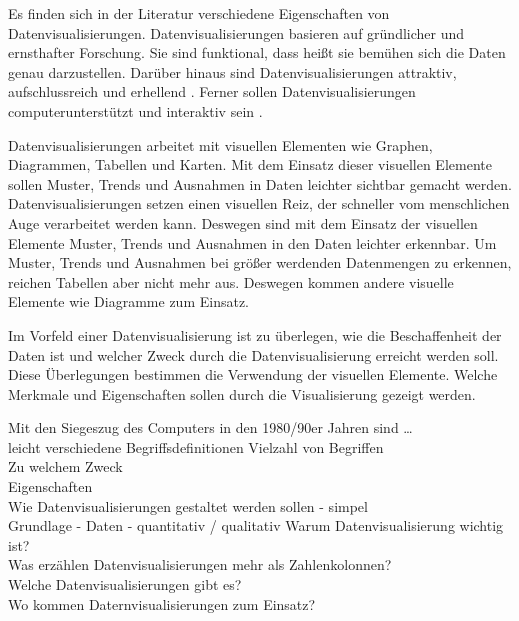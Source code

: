 Es finden sich in der Literatur verschiedene Eigenschaften von Datenvisualisierungen.
Datenvisualisierungen basieren auf gründlicher und ernsthafter Forschung. Sie sind funktional, dass heißt
sie bemühen sich die Daten genau darzustellen. Darüber hinaus sind Datenvisualisierungen attraktiv, 
aufschlussreich und erhellend \cite[Vgl.][45]{cairo_truthful_2016}. 
Ferner sollen Datenvisualisierungen computerunterstützt und interaktiv sein \cite[Vgl.][12]{few_now_2009}.


Datenvisualisierungen arbeitet mit visuellen Elementen wie Graphen, Diagrammen, Tabellen und Karten.
Mit dem Einsatz dieser visuellen Elemente sollen Muster, Trends und Ausnahmen in Daten leichter sichtbar gemacht werden\cite[Vgl.][12]{few_now_2009}.
Datenvisualisierungen setzen einen visuellen Reiz, der schneller vom menschlichen Auge verarbeitet werden kann. 
Deswegen sind mit dem Einsatz der visuellen Elemente Muster, Trends und Ausnahmen in den Daten leichter erkennbar.
Um Muster, Trends und Ausnahmen bei größer werdenden Datenmengen zu erkennen, reichen Tabellen aber nicht mehr aus. Deswegen
kommen andere visuelle Elemente wie Diagramme zum Einsatz. 


Im Vorfeld einer Datenvisualisierung ist zu überlegen, wie die Beschaffenheit der Daten ist und welcher Zweck durch die Datenvisualisierung erreicht werden soll.
Diese Überlegungen bestimmen die Verwendung der visuellen Elemente. 
Welche Merkmale und Eigenschaften sollen durch die Visualisierung gezeigt werden.\cite[Vgl.][17]{kirk_data_2019}

Mit den Siegeszug des Computers in den 1980/90er Jahren sind \dots\\
leicht verschiedene Begriffsdefinitionen
Vielzahl von Begriffen\\ 
Zu welchem Zweck\\
Eigenschaften\\
Wie Datenvisualisierungen gestaltet werden sollen - simpel\\
Grundlage - Daten - quantitativ / qualitativ
Warum Datenvisualisierung wichtig ist?\\
Was erzählen Datenvisualisierungen mehr als Zahlenkolonnen?\\
Welche Datenvisualisierungen gibt es?\\
Wo kommen Daternvisualisierungen zum Einsatz?\\

